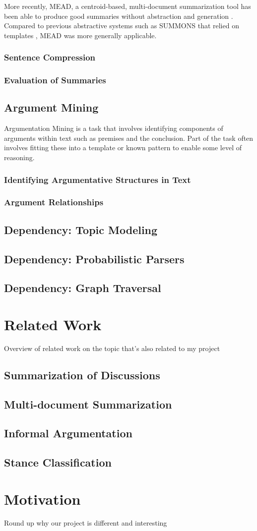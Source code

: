         More recently, MEAD, a centroid-based, multi-document summarization tool has been able to produce good summaries without abstraction and generation \cite{radev2000centroid}. Compared to previous abstractive systems such as SUMMONS that relied on templates \cite{mckeown1995generating}, MEAD was more generally applicable.

      \subsubsection{Sentence Compression}
      \subsubsection{Evaluation of Summaries}

    \subsection{Argument Mining}
      Argumentation Mining is a task that involves identifying components of arguments within text such as premises and the conclusion. Part of the task often involves fitting these into a template or known pattern to enable some level of reasoning.
      \subsubsection{Identifying Argumentative Structures in Text}
      \subsubsection{Argument Relationships}
    \subsection{Dependency: Topic Modeling}
    \subsection{Dependency: Probabilistic Parsers}
    \subsection{Dependency: Graph Traversal}


  \section{Related Work}
    Overview of related work on the topic that's also related to my project
    \subsection{Summarization of Discussions}
    \subsection{Multi-document Summarization}
    \subsection{Informal Argumentation}
    \subsection{Stance Classification}
  \section{Motivation}
    Round up why our project is different and interesting
